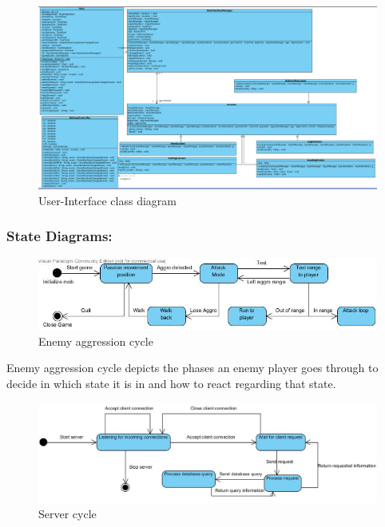 \documentclass[letterpaper]{article}
\begin{document}
					\begin{figure}[H]
					\centering
					\includegraphics[width=180mm]{UML_Diagram/Class/GUI_Classes.jpg}
					\caption{User-Interface class diagram}
					\label{overflow}
					\end{figure}
					
				\vspace{0.2in}
				\subsubsection*{State Diagrams:}
				\vspace{0.1in}
					
					\begin{figure}[H]
					\centering
					\includegraphics[width=180mm]{UML_Diagram/State/Mob_Aggro.jpg}
					\caption{Enemy aggression cycle}
					\label{overflow}
					\end{figure}
					
					Enemy aggression cycle depicts the phases an enemy player goes through to decide in which state it is in and how to react regarding that state.
					
						\begin{figure}[H]
					\centering
					\includegraphics[width=180mm]{UML_Diagram/State/Server_State_Diagram.jpg}
					\caption{Server cycle}
					\label{overflow}
					\end{figure}
					
\end{document}
